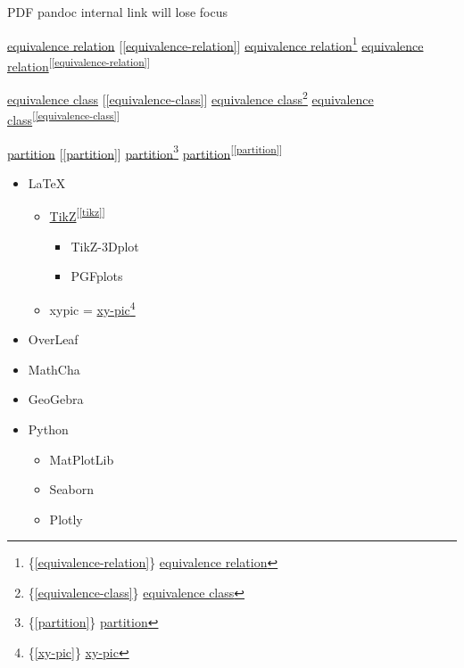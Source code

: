 \documentclass[
]{book}
\providecommand{\tightlist}{%
  \setlength{\itemsep}{0pt}\setlength{\parskip}{0pt}}
\theoremstyle{definition}
\theoremstyle{definition}
\theoremstyle{definition}
\theoremstyle{definition}
\theoremstyle{remark}
\begin{document}
PDF pandoc internal link will lose focus

\protect\hyperlink{equivalence-relation}{equivalence relation} {[}\ref{equivalence-relation}{]} \protect\hyperlink{equivalence-relation}{equivalence relation}\footnote{\{\ref{equivalence-relation}\} \protect\hyperlink{equivalence-relation}{equivalence relation}} \protect\hyperlink{equivalence-relation}{equivalence relation}\textsuperscript{{[}\ref{equivalence-relation}{]}}

\protect\hyperlink{equivalence-class}{equivalence class} {[}\ref{equivalence-class}{]} \protect\hyperlink{equivalence-class}{equivalence class}\footnote{\{\ref{equivalence-class}\} \protect\hyperlink{equivalence-class}{equivalence class}} \protect\hyperlink{equivalence-class}{equivalence class}\textsuperscript{{[}\ref{equivalence-class}{]}}

\protect\hyperlink{partition}{partition} {[}\ref{partition}{]} \protect\hyperlink{partition}{partition}\footnote{\{\ref{partition}\} \protect\hyperlink{partition}{partition}} \protect\hyperlink{partition}{partition}\textsuperscript{{[}\ref{partition}{]}}

\begin{itemize}
\tightlist
\item
  LaTeX

  \begin{itemize}
  \tightlist
  \item
    \protect\hyperlink{tikz}{TikZ}\textsuperscript{{[}\ref{tikz}{]}}

    \begin{itemize}
    \tightlist
    \item
      TikZ-3Dplot
    \item
      PGFplots
    \end{itemize}
  \item
    xypic = \protect\hyperlink{xy-pic}{xy-pic}\footnote{\{\ref{xy-pic}\} \protect\hyperlink{xy-pic}{xy-pic}}
  \end{itemize}
\item
  OverLeaf
\item
  MathCha
\item
  GeoGebra
\item
  Python

  \begin{itemize}
  \tightlist
  \item
    MatPlotLib
  \item
    Seaborn
  \item
    Plotly
  \end{itemize}
\end{itemize}
\end{document}
